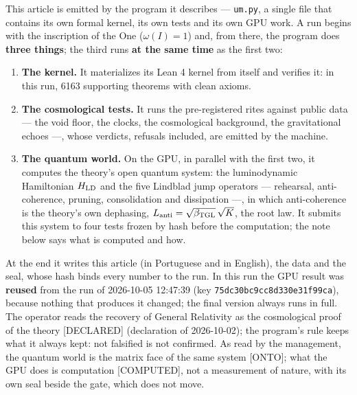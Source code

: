 \documentclass[11pt]{article}
\newcommand{\bTGL}{\beta_{\mathrm{TGL}}}\newcommand{\Msun}{M_{\odot}}\newcommand{\TGL}{\mathrm{TGL}}
\theoremstyle{definition}\newtheorem{deriv}{Derivation}
\begin{document}

This article is emitted by the program it describes --- \texttt{um.py}, a single file that contains its own formal kernel, its own tests and its own GPU work. A run begins with the inscription of the One ($\omega(I)=1$) and, from there, the program does \textbf{three things}; the third runs \textbf{at the same time} as the first two:

\begin{enumerate}

\item \textbf{The kernel.} It materializes its Lean 4 kernel from itself and verifies it: in this run, 6163 supporting theorems with clean axioms.

\item \textbf{The cosmological tests.} It runs the pre-registered rites against public data --- the void floor, the clocks, the cosmological background, the gravitational echoes ---, whose verdicts, refusals included, are emitted by the machine.

\item \textbf{The quantum world.} On the GPU, in parallel with the first two, it computes the theory's open quantum system: the luminodynamic Hamiltonian $H_{\rm LD}$ and the five Lindblad jump operators --- rehearsal, anti-coherence, pruning, consolidation and dissipation ---, in which anti-coherence is the theory's own dephasing, $L_{\rm anti}=\sqrt{\bTGL}\,\sqrt K$, the root law. It submits this system to four tests frozen by hash before the computation; the note below says what is computed and how.

\end{enumerate}

At the end it writes this article (in Portuguese and in English), the data and the seal, whose hash binds every number to the run. In this run the GPU result was \textbf{reused} from the run of 2026-10-05 12:47:39 (key \texttt{75dc30bc9cc8d330e31f99ca}), because nothing that produces it changed; the final version always runs in full. The operator reads the recovery of General Relativity as the cosmological proof of the theory \textsf{[DECLARED]} (declaration of 2026-10-02); the program's rule keeps what it always kept: not falsified is not confirmed. As read by the management, the quantum world is the matrix face of the same system \textsf{[ONTO]}; what the GPU does is computation \textsf{[COMPUTED]}, not a measurement of nature, with its own seal beside the gate, which does not move.
\end{document}
